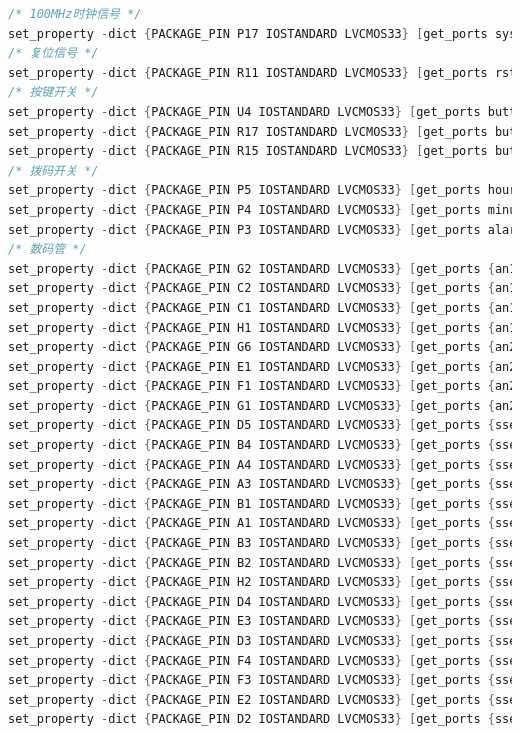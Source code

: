 \documentclass{article}
\begin{document}
\begin{lstlisting}[language=Verilog, caption={约束文件}]
/* 100MHz时钟信号 */
set_property -dict {PACKAGE_PIN P17 IOSTANDARD LVCMOS33} [get_ports sys_clk]
/* 复位信号 */
set_property -dict {PACKAGE_PIN R11 IOSTANDARD LVCMOS33} [get_ports rst]
/* 按键开关 */
set_property -dict {PACKAGE_PIN U4 IOSTANDARD LVCMOS33} [get_ports button_inc]
set_property -dict {PACKAGE_PIN R17 IOSTANDARD LVCMOS33} [get_ports button_dec]
set_property -dict {PACKAGE_PIN R15 IOSTANDARD LVCMOS33} [get_ports button_close]
/* 拨码开关 */
set_property -dict {PACKAGE_PIN P5 IOSTANDARD LVCMOS33} [get_ports hour_setting]
set_property -dict {PACKAGE_PIN P4 IOSTANDARD LVCMOS33} [get_ports minute_setting]
set_property -dict {PACKAGE_PIN P3 IOSTANDARD LVCMOS33} [get_ports alarm_setting]
/* 数码管 */
set_property -dict {PACKAGE_PIN G2 IOSTANDARD LVCMOS33} [get_ports {an1[0]}]
set_property -dict {PACKAGE_PIN C2 IOSTANDARD LVCMOS33} [get_ports {an1[1]}]
set_property -dict {PACKAGE_PIN C1 IOSTANDARD LVCMOS33} [get_ports {an1[2]}]
set_property -dict {PACKAGE_PIN H1 IOSTANDARD LVCMOS33} [get_ports {an1[3]}]
set_property -dict {PACKAGE_PIN G6 IOSTANDARD LVCMOS33} [get_ports {an2[3]}]
set_property -dict {PACKAGE_PIN E1 IOSTANDARD LVCMOS33} [get_ports {an2[2]}]
set_property -dict {PACKAGE_PIN F1 IOSTANDARD LVCMOS33} [get_ports {an2[1]}]
set_property -dict {PACKAGE_PIN G1 IOSTANDARD LVCMOS33} [get_ports {an2[0]}]
set_property -dict {PACKAGE_PIN D5 IOSTANDARD LVCMOS33} [get_ports {sseg1[7]}]
set_property -dict {PACKAGE_PIN B4 IOSTANDARD LVCMOS33} [get_ports {sseg1[6]}]
set_property -dict {PACKAGE_PIN A4 IOSTANDARD LVCMOS33} [get_ports {sseg1[5]}]
set_property -dict {PACKAGE_PIN A3 IOSTANDARD LVCMOS33} [get_ports {sseg1[4]}]
set_property -dict {PACKAGE_PIN B1 IOSTANDARD LVCMOS33} [get_ports {sseg1[3]}]
set_property -dict {PACKAGE_PIN A1 IOSTANDARD LVCMOS33} [get_ports {sseg1[2]}]
set_property -dict {PACKAGE_PIN B3 IOSTANDARD LVCMOS33} [get_ports {sseg1[1]}]
set_property -dict {PACKAGE_PIN B2 IOSTANDARD LVCMOS33} [get_ports {sseg1[0]}]
set_property -dict {PACKAGE_PIN H2 IOSTANDARD LVCMOS33} [get_ports {sseg2[7]}]
set_property -dict {PACKAGE_PIN D4 IOSTANDARD LVCMOS33} [get_ports {sseg2[6]}]
set_property -dict {PACKAGE_PIN E3 IOSTANDARD LVCMOS33} [get_ports {sseg2[5]}]
set_property -dict {PACKAGE_PIN D3 IOSTANDARD LVCMOS33} [get_ports {sseg2[4]}]
set_property -dict {PACKAGE_PIN F4 IOSTANDARD LVCMOS33} [get_ports {sseg2[3]}]
set_property -dict {PACKAGE_PIN F3 IOSTANDARD LVCMOS33} [get_ports {sseg2[2]}]
set_property -dict {PACKAGE_PIN E2 IOSTANDARD LVCMOS33} [get_ports {sseg2[1]}]
set_property -dict {PACKAGE_PIN D2 IOSTANDARD LVCMOS33} [get_ports {sseg2[0]}]
\end{lstlisting}
\end{document}
